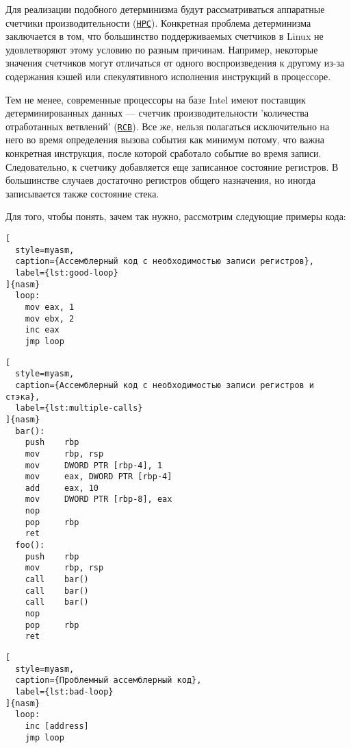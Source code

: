 Для реализации подобного детерминизма будут рассматриваться аппаратные счетчики производительности 
(\href{https://en.wikipedia.org/wiki/Hardware_performance_counter}{\texttt{HPC}}).
Конкретная проблема детерминизма заключается в том, что большинство поддерживаемых счетчиков в Linux 
не удовлетворяют этому условию по разным причинам. 
Например, некоторые значения счетчиков могут отличаться от одного воспроизведения к другому 
из-за содержания кэшей или спекулятивного исполнения инструкций в процессоре.

Тем не менее, современные процессоры на базе Intel имеют поставщик детерминированных данных — счетчик производительности 
'количества отработанных ветвлений'
(\href{https://en.wikipedia.org/wiki/Branch_predictor}{\texttt{RCB}}). 
Все же, нельзя полагаться исключительно на него во время определения вызова события как 
минимум потому, что важна конкретная инструкция, после которой сработало событие во время записи. 
Следовательно, к счетчику добавляется еще 
записанное состояние регистров. 
В большинстве случаев достаточно регистров общего назначения, но иногда записывается также состояние стека. 

Для того, чтобы понять, зачем так нужно, рассмотрим следующие примеры кода:

\begin{lstlisting}[
  style=myasm,
  caption={Ассемблерный код с необходимостью записи регистров},
  label={lst:good-loop}
]{nasm}
  loop:
    mov eax, 1
    mov ebx, 2
    inc eax
    jmp loop
\end{lstlisting}

\begin{lstlisting}[
  style=myasm,
  caption={Ассемблерный код с необходимостью записи регистров и стэка},
  label={lst:multiple-calls}
]{nasm}
  bar():
    push    rbp
    mov     rbp, rsp
    mov     DWORD PTR [rbp-4], 1
    mov     eax, DWORD PTR [rbp-4]
    add     eax, 10
    mov     DWORD PTR [rbp-8], eax
    nop
    pop     rbp
    ret
  foo():
    push    rbp
    mov     rbp, rsp
    call    bar()
    call    bar()
    call    bar()
    nop
    pop     rbp
    ret
\end{lstlisting}

\begin{lstlisting}[
  style=myasm,
  caption={Проблемный ассемблерный код},
  label={lst:bad-loop}
]{nasm}
  loop:
    inc [address]
    jmp loop
\end{lstlisting}

